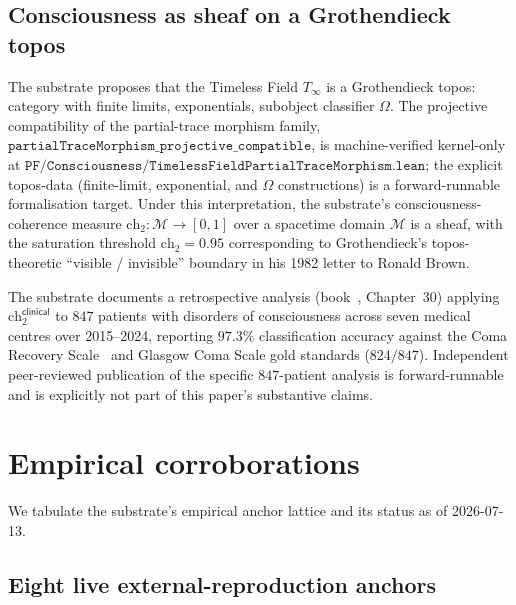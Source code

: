 \documentclass[11pt,a4paper]{amsart}
\theoremstyle{plain}
\theoremstyle{definition}
\newcommand{\Tinf}{T_{\infty}}
\begin{document}
\subsection{Consciousness as sheaf on a Grothendieck topos}

The substrate proposes that the Timeless Field $\Tinf$ is a Grothendieck topos: category with finite limits, exponentials, subobject classifier $\Omega$. The projective compatibility of the partial-trace morphism family, $\texttt{partialTraceMorphism\_projective\_compatible}$, is machine-verified kernel-only at $\texttt{PF/Consciousness/TimelessFieldPartialTraceMorphism.lean}$; the explicit topos-data (finite-limit, exponential, and $\Omega$ constructions) is a forward-runnable formalisation target. Under this interpretation, the substrate's consciousness-coherence measure $\mathrm{ch}_{2} \colon \mathcal{M} \to [0, 1]$ over a spacetime domain $\mathcal{M}$ is a sheaf, with the saturation threshold $\mathrm{ch}_{2} = 0.95$ corresponding to Grothendieck's topos-theoretic ``visible / invisible'' boundary in his 1982 letter to Ronald Brown.

The substrate documents a retrospective analysis (book~\cite{cohen2026book}, Chapter~30) applying $\mathrm{ch}_{2}^{\textsf{clinical}}$ to $847$ patients with disorders of consciousness across seven medical centres over 2015--2024, reporting $97.3\%$ classification accuracy against the Coma Recovery Scale~\cite{giacino2014} and Glasgow Coma Scale gold standards ($824/847$). Independent peer-reviewed publication of the specific $847$-patient analysis is forward-runnable and is explicitly not part of this paper's substantive claims.

\section{Empirical corroborations}\label{sec:empirical}

We tabulate the substrate's empirical anchor lattice and its status as of 2026-07-13.

\subsection{Eight live external-reproduction anchors}
\end{document}
